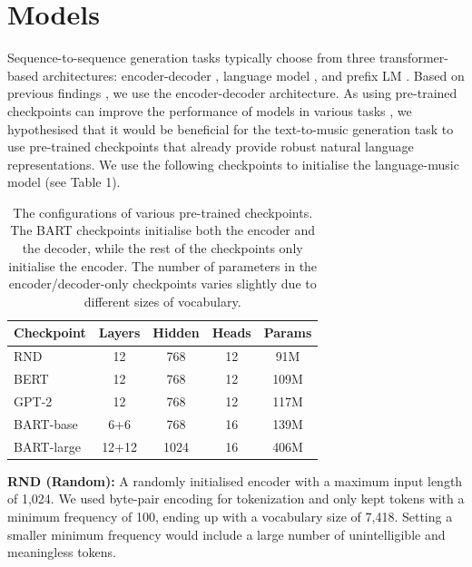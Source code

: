 \documentclass[letterpaper]{article} %
\begin{document}
\section{Models}
Sequence-to-sequence generation tasks typically choose from three transformer-based architectures: encoder-decoder \cite{DBLP:conf/nips/VaswaniSPUJGKP17}, language model \cite{radford2018improving}, and prefix LM \cite{DBLP:conf/iclr/LiuSPGSKS18}. Based on previous findings \cite{DBLP:journals/jmlr/RaffelSRLNMZLL20}, we use the encoder-decoder architecture. As using pre-trained checkpoints can improve the performance of models in various tasks \cite{DBLP:journals/tacl/RotheNS20}, we hypothesised that it would be beneficial for the text-to-music generation task to use pre-trained checkpoints that already provide robust natural language representations. We use the following checkpoints to initialise the language-music model (see Table 1).

\begin{table}[t!]
  \begin{center}
    \caption{The configurations of various pre-trained checkpoints. The BART checkpoints initialise both the encoder and the decoder, while the rest of the checkpoints only initialise the encoder. The number of parameters in the encoder/decoder-only checkpoints varies slightly due to different sizes of vocabulary.}
    \begin{tabular}{l|c|c|c|c}
      \toprule %
      Checkpoint & Layers & Hidden & Heads & Params\\
      \midrule %
      RND & 12 & 768 & 12 & 91M\\
      BERT & 12 & 768 & 12 & 109M\\
      GPT-2 & 12 & 768 & 12 & 117M\\
      BART-base & 6+6 & 768 & 16 & 139M\\
      BART-large & 12+12 & 1024 & 16 & 406M\\
      \bottomrule %
    \end{tabular}
  \end{center}
\end{table}

\noindent
\textbf{RND (Random):} A randomly initialised encoder with a maximum input length of 1,024. We used byte-pair encoding for tokenization and only kept tokens with a minimum frequency of 100, ending up with a vocabulary size of 7,418. Setting a smaller minimum frequency would include a large number of unintelligible and meaningless tokens.
\end{document}
